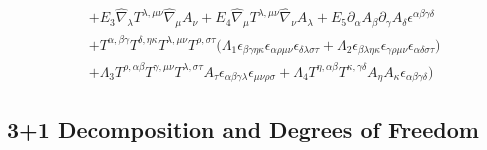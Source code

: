 \documentclass[%
  showpacs,showkeys,prd,superscriptaddress]{revtex4-1}
\begin{document}
\begin{equation}
\begin{split}
    \\
    & + E_3\hat{\nabla}_\lambda T^{\lambda,\mu\nu}\hat{\nabla}_\mu A_\nu+E_4\hat{\nabla}_\mu T^{\lambda,\mu\nu}\hat{\nabla}_\nu A_\lambda + E_5\partial_\alpha A_\beta\partial_\gamma A_\delta \epsilon^{\alpha\beta\gamma\delta}
    \\
    & + T^{\alpha,\beta\gamma}T^{\delta,\eta\kappa}T^{\lambda,\mu\nu}T^{\rho,\sigma\tau}\Big(\Lambda_1\epsilon_{\beta\gamma\eta\kappa}\epsilon_{\alpha\rho\mu\nu}\epsilon_{\delta\lambda\sigma\tau}+\Lambda_2\epsilon_{\beta\lambda\eta\kappa}\epsilon_{\gamma\rho\mu\nu}\epsilon_{\alpha\delta\sigma\tau}\Big)
    \\
    & + \Lambda_3 T^{\rho,\alpha\beta}T^{\gamma,\mu\nu}T^{\lambda,\sigma\tau}A_\tau \epsilon_{\alpha\beta\gamma\lambda}\epsilon_{\mu\nu\rho\sigma}+\Lambda_4T^{\eta,\alpha\beta}T^{\kappa,\gamma\delta}A_\eta A_\kappa\epsilon_{\alpha\beta\gamma\delta}\Bigg)
  \end{split}
\end{equation}


\subsection*{3+1 Decomposition  and Degrees of Freedom}
\end{document}

